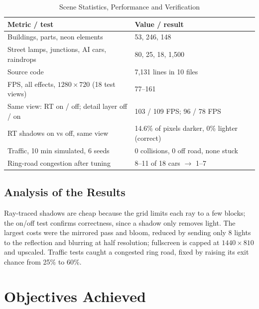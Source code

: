 \documentclass[12pt, a4paper]{report}
\begin{document}
\begin{table}[!htbp]
  \caption{Scene Statistics, Performance and Verification}
  \label{tab:4.2}
  \centering
  {\fontsize{10}{13}\selectfont
    \begin{tabular}{|p{2.6in}|p{2.7in}|}
      \hline
      \textbf{Metric / test} & \textbf{Value / result} \\
      \hline
      Buildings, parts, neon elements & 53, 246, 148 \\
      \hline
      Street lamps, junctions, AI cars, raindrops & 80, 25, 18, 1,500 \\
      \hline
      Source code & 7,131 lines in 10 files \\
      \hline
      FPS, all effects, $1280\times720$ (18 test views) & 77--161 \\
      \hline
      Same view: RT on / off; detail layer off / on & 103 / 109 FPS; 96 / 78 FPS \\
      \hline
      RT shadows on vs off, same view & 14.6\% of pixels darker, 0\% lighter (correct) \\
      \hline
      Traffic, 10 min simulated, 6 seeds & 0 collisions, 0 off road, none stuck \\
      \hline
      Ring-road congestion after tuning & 8--11 of 18 cars $\rightarrow$ 1--7 \\
      \hline
    \end{tabular}
  }
\end{table}

\subsection{Analysis of the Results}

\begin{justify}
  {\fontsize{12}{13.8}\selectfont
    Ray-traced shadows are cheap because the grid limits each ray to a few blocks; the on/off test confirms correctness, since a shadow only removes light. The largest costs were the mirrored pass and bloom, reduced by sending only 8 lights to the reflection and blurring at half resolution; fullscreen is capped at $1440\times810$ and upscaled. Traffic tests caught a congested ring road, fixed by raising its exit chance from 25\% to 60\%.
  }
\end{justify}

\section{Objectives Achieved}
\end{document}
